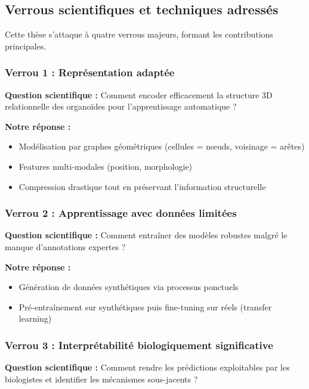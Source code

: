 \subsection{Verrous scientifiques et techniques adressés}

Cette thèse s'attaque à quatre verrous majeurs, formant les contributions principales.

\subsubsection{Verrou 1 : Représentation adaptée}

\textbf{Question scientifique :} Comment encoder efficacement la structure 3D relationnelle des organoïdes pour l'apprentissage automatique ?

\textbf{Notre réponse :}
\begin{itemize}
    \item Modélisation par graphes géométriques (cellules = nœuds, voisinage = arêtes)
    \item Features multi-modales (position, morphologie)
    \item Compression drastique tout en préservant l'information structurelle
\end{itemize}

\subsubsection{Verrou 2 : Apprentissage avec données limitées}

\textbf{Question scientifique :} Comment entraîner des modèles robustes malgré le manque d'annotations expertes ?

\textbf{Notre réponse :}
\begin{itemize}
    \item Génération de données synthétiques via processus ponctuels
    \item Pré-entraînement sur synthétiques puis fine-tuning sur réels (transfer learning)
\end{itemize}

\subsubsection{Verrou 3 : Interprétabilité biologiquement significative}

\textbf{Question scientifique :} Comment rendre les prédictions exploitables par les biologistes et identifier les mécanismes sous-jacents ?

